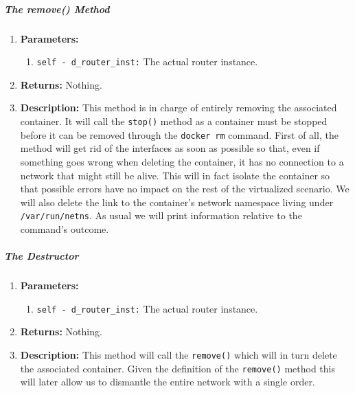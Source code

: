         \subparagraph{The remove() Method}
            \begin{enumerate}
                \item \textbf{Parameters:}
                \begin{enumerate}
                    \item \texttt{self - d\_router\_inst:} The actual router instance.
                \end{enumerate}
                \item \textbf{Returns:} Nothing.
                \item \textbf{Description:} This method is in charge of entirely removing the associated container. It will call the \texttt{stop()} method as a container must be stopped before it can be removed through the \texttt{docker rm} command. First of all, the method will get rid of the interfaces as soon as possible so that, even if something goes wrong when deleting the container, it has no connection to a network that might still be alive. This will in fact isolate the container so that possible errors have no impact on the rest of the virtualized scenario. We will also delete the link to the container's network namespace living under \texttt{/var/run/netns}. As usual we will print information relative to the command's outcome.
            \end{enumerate}

        \subparagraph{The Destructor}
            \begin{enumerate}
                \item \textbf{Parameters:}
                \begin{enumerate}
                    \item \texttt{self - d\_router\_inst:} The actual router instance.
                \end{enumerate}
                \item \textbf{Returns:} Nothing.
                \item \textbf{Description:} This method will call the \texttt{remove()} which will in turn delete the associated container. Given the definition of the \texttt{remove()} method this will later allow us to dismantle the entire network with a single order.
            \end{enumerate}
